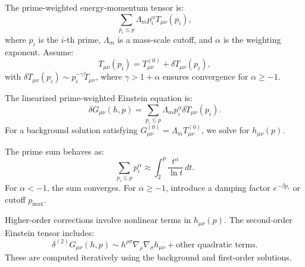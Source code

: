 \documentclass{article}
\theoremstyle{plain}
\theoremstyle{claimstyle}
\begin{document}
The prime-weighted energy-momentum tensor is:
\begin{equation}
\sum_{p_i \leq p} \Lambda_m p_i^{\alpha} T_{\mu\nu}(p_i),
\end{equation}
where \( p_i \) is the \( i \)-th prime, \( \Lambda_m \) is a mass-scale cutoff, and \( \alpha \) is the weighting exponent. Assume:
\begin{equation}
T_{\mu\nu}(p_i) = T_{\mu\nu}^{(0)} + \delta T_{\mu\nu}(p_i),
\end{equation}
with \( \delta T_{\mu\nu}(p_i) \sim p_i^{-\gamma} \tilde{T}_{\mu\nu} \), where \( \gamma > 1 + \alpha \) ensures convergence for \( \alpha \geq -1 \).

The linearized prime-weighted Einstein equation is:
\begin{equation}
\delta G_{\mu\nu}(h, p) = \sum_{p_i \leq p} \Lambda_m p_i^{\alpha} \delta T_{\mu\nu}(p_i).
\end{equation}
For a background solution satisfying \( G_{\mu\nu}^{(0)} = \Lambda_m T_{\mu\nu}^{(0)} \), we solve for \( h_{\mu\nu}(p) \).

The prime sum behaves as:
\begin{equation}
\sum_{p_i \leq p} p_i^{\alpha} \approx \int_{2}^{p} \frac{t^{\alpha}}{\ln t} \, dt.
\end{equation}
For \( \alpha < -1 \), the sum converges. For \( \alpha \geq -1 \), introduce a damping factor \( e^{-\beta p_i} \) or cutoff \( p_{\text{max}} \).

Higher-order corrections involve nonlinear terms in \( h_{\mu\nu}(p) \). The second-order Einstein tensor includes:
\begin{equation}
\delta^{(2)} G_{\mu\nu}(h, p) \sim h^{\rho\sigma} \nabla_{\rho} \nabla_{\sigma} h_{\mu\nu} + \text{other quadratic terms}.
\end{equation}
These are computed iteratively using the background and first-order solutions.

\nocite{*}


\end{document}
